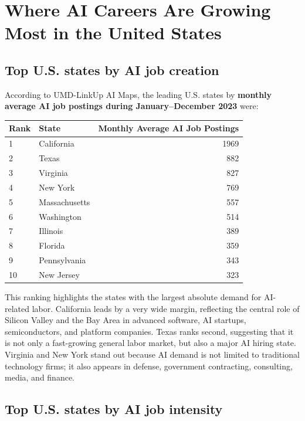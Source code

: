 \documentclass[12pt,a4paper]{article}
\begin{document}
\section{Where AI Careers Are Growing Most in the United States}

\subsection{Top U.S. states by AI job creation}

According to UMD-LinkUp AI Maps, the leading U.S. states by \textbf{monthly average AI job postings during January--December 2023} were:

\begin{center}
\begin{tabular}{llr}
\toprule
\textbf{Rank} & \textbf{State} & \textbf{Monthly Average AI Job Postings} \\
\midrule
1 & California & 1969 \\
2 & Texas & 882 \\
3 & Virginia & 827 \\
4 & New York & 769 \\
5 & Massachusetts & 557 \\
6 & Washington & 514 \\
7 & Illinois & 389 \\
8 & Florida & 359 \\
9 & Pennsylvania & 343 \\
10 & New Jersey & 323 \\
\bottomrule
\end{tabular}
\end{center}

This ranking highlights the states with the largest absolute demand for AI-related labor. California leads by a very wide margin, reflecting the central role of Silicon Valley and the Bay Area in advanced software, AI startups, semiconductors, and platform companies. Texas ranks second, suggesting that it is not only a fast-growing general labor market, but also a major AI hiring state. Virginia and New York stand out because AI demand is not limited to traditional technology firms; it also appears in defense, government contracting, consulting, media, and finance.

\subsection{Top U.S. states by AI job intensity}
\end{document}

